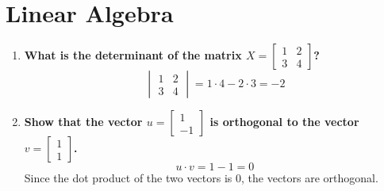 \documentclass{article}
\begin{document}
\section*{Linear Algebra}
\begin{enumerate}
    \item \textbf{What is the determinant of the matrix $X=\begin{bmatrix}1 & 2 \\ 3 & 4\end{bmatrix}$?}
    \[\begin{vmatrix}
        1 & 2 \\ 3 & 4
    \end{vmatrix}=1\cdot 4 - 2\cdot 3 = -2\]
    \item \textbf{Show that the vector $u=\begin{bmatrix}1 \\ -1\end{bmatrix}$ is orthogonal to the vector $v=\begin{bmatrix}1 \\ 1\end{bmatrix}$.}
    \[u\cdot v = 1 - 1 = 0\]
    Since the dot product of the two vectors is 0, the vectors are orthogonal.
\end{enumerate}
\end{document}
